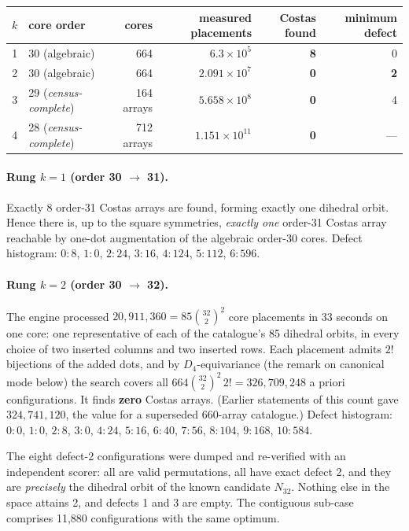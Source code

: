 \documentclass[11pt,a4paper]{article}
\theoremstyle{definition}
\begin{document}
\begin{center}
\begin{tabular}{@{}rlrrrr@{}}
\toprule
$k$ & core order & cores & measured placements & Costas found & minimum defect \\
\midrule
1 & 30 (algebraic) & 664 & $6.3\times10^5$ & \textbf{8} & 0 \\
2 & 30 (algebraic) & 664 & $2.091\times10^{7}$ & \textbf{0} & \textbf{2} \\
3 & 29 (\emph{census-complete}) & 164 arrays & $5.658\times10^{8}$ & \textbf{0} & 4 \\
4 & 28 (\emph{census-complete}) & 712 arrays & $1.151\times10^{11}$ & \textbf{0} & --- \\
\bottomrule
\end{tabular}
\end{center}

\paragraph{Rung $k=1$ (order 30 $\to$ 31).}
Exactly 8 order-31 Costas arrays are found, forming exactly one dihedral orbit.
Hence there is, up to the square symmetries, \emph{exactly one} order-31 Costas
array reachable by one-dot augmentation of the algebraic order-30 cores. Defect
histogram: $0{:}8$, $1{:}0$, $2{:}24$, $3{:}16$, $4{:}124$, $5{:}112$,
$6{:}596$.

\paragraph{Rung $k=2$ (order 30 $\to$ 32).}
The engine processed $20{,}911{,}360=85\binom{32}{2}^2$ core placements in 33 seconds on one core: one representative of each of the catalogue's 85
dihedral orbits, in every choice of two inserted columns and two inserted rows. Each placement admits $2!$ bijections of the
added dots, and by $D_4$-equivariance (the remark on canonical mode below) the search covers all $664\binom{32}{2}^2\,2!=326{,}709{,}248$ a priori configurations. It
finds \textbf{zero} Costas arrays. (Earlier statements of this count gave $324{,}741{,}120$, the value for a superseded 660-array catalogue.)
Defect histogram: $0{:}0$, $1{:}0$, $2{:}8$, $3{:}0$, $4{:}24$, $5{:}16$,
$6{:}40$, $7{:}56$, $8{:}104$, $9{:}168$, $10{:}584$.

The eight defect-2 configurations were dumped and re-verified with an
independent scorer: all are valid permutations, all have exact defect 2, and
they are \emph{precisely} the dihedral orbit of the known candidate $N_{32}$.
Nothing else in the space attains 2, and defects 1 and 3 are empty. The
contiguous sub-case comprises 11{,}880 configurations with the same optimum.
\end{document}
